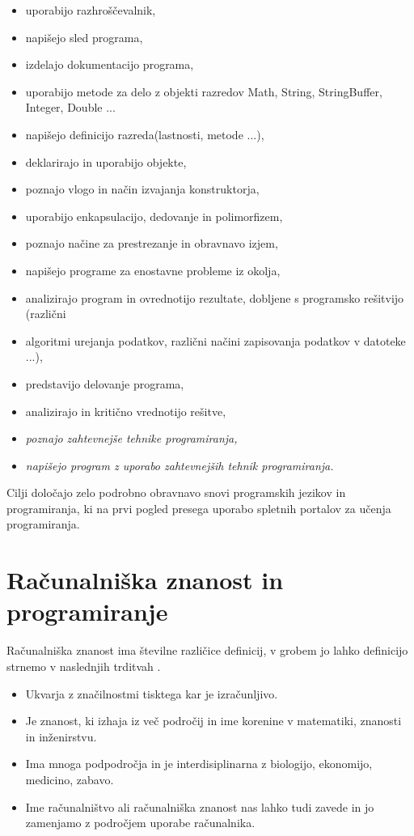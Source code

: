 \begin{itemize}
\item uporabijo razhroščevalnik,
\item napišejo sled programa,
\item izdelajo dokumentacijo programa,
\item uporabijo metode za delo z objekti razredov Math, String, StringBuffer, Integer, Double ...
\item napišejo definicijo razreda(lastnosti, metode ...),
\item deklarirajo in uporabijo objekte,
\item poznajo vlogo in način izvajanja konstruktorja,
\item uporabijo enkapsulacijo, dedovanje in polimorfizem,
\item poznajo načine za prestrezanje in obravnavo izjem,
\item napišejo programe za enostavne probleme iz okolja,
\item analizirajo program in ovrednotijo rezultate, dobljene s programsko rešitvijo (različni
\item algoritmi urejanja podatkov, različni načini zapisovanja podatkov v datoteke ...),
\item predstavijo delovanje programa,
\item analizirajo in kritično vrednotijo rešitve,
\item \emph{poznajo zahtevnejše tehnike programiranja,}
\item \emph{napišejo program z uporabo zahtevnejših tehnik programiranja.}
\end{itemize}

Cilji določajo zelo podrobno obravnavo snovi programskih jezikov in
programiranja, ki na prvi pogled presega uporabo spletnih portalov za
učenja programiranja.


\section{Računalniška znanost in programiranje}
\label{sec:računalniška_znanost_in_programiranje}

Računalniška znanost ima številne različice definicij, v grobem jo
lahko definicijo strnemo v naslednjih trditvah \cite{guideTCS}.

\begin{itemize}
\tightlist
\item Ukvarja z značilnostmi tisktega kar je izračunljivo.
\item Je znanost, ki izhaja iz več področij in ime korenine v matematiki,
znanosti in inženirstvu.
\item Ima mnoga podpodročja in je interdisiplinarna z biologijo,
ekonomijo, medicino, zabavo.
\item Ime računalništvo ali računalniška znanost nas lahko tudi zavede in
jo zamenjamo z področjem uporabe računalnika.
\end{itemize}

